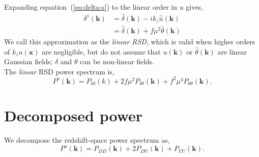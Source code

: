 \documentclass[a4paper,11pt, fleqn]{article}
\begin{document}
Expanding equation~(\ref{eq:delta-s}) to the linear order in $u$ gives,
%
\begin{align}
  \delta^s(\bm{k}) &= \hat{\delta}(\bm{k}) - ik_z \hat{u}(\bm{k})\\
   &= \hat{\delta}(\bm{k}) + f\mu^2 \hat{\theta}(\bm{k})
\end{align}
%
We call this approximation as the \textit{linear RSD}, which is valid
when higher orders of $k_z u(\bm{x})$ are negligible, but do not
assume that $u(\bm{k})$ or $\hat{\theta}(\bm{k})$ are linear Gaussian
fields; $\delta$ and $\theta$ can be non-linear fields.\\

The \textit{linear} RSD power spectrum is,
%
\begin{equation}
  P^s(\bm{k}) = P_{\delta\delta}(k) +
  2f\mu^2 P_{\delta \theta}(\bm{k}) + f^2\mu^4 P_{\theta\theta}(\bm{k}).
\end{equation}


%
%
\newpage
\section{Decomposed power}

We decompose the redshift-space power spectrum as,
%
\begin{equation}
  P^s(\bm{k}) = P_{DD}(\bm{k}) + 2 P_{DU}(\bm{k}) + P_{UU}(\bm{k}).
\end{equation}
\end{document}
